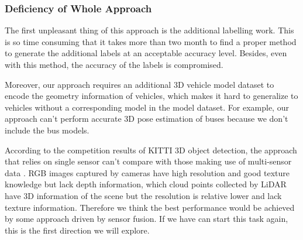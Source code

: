 \subsubsection{Deficiency of Whole Approach}
The first unpleasant thing of this approach is the additional labelling work. This is so time consuming that it takes more than two month to find a proper method to generate the additional labels at an acceptable accuracy level. Besides, even with this method, the accuracy of the labels is compromised.

Moreover, our approach requires an additional 3D vehicle model dataset to encode the geometry information of vehicles, which makes it hard to generalize to vehicles without a corresponding model in the model dataset. For example, our approach can't perform accurate 3D pose estimation of buses because we don't include the bus models.

According to the competition results of KITTI 3D object detection, the approach that relies on single sensor can't compare with those making use of multi-sensor data \cite{3dobject}. RGB images captured by cameras have high resolution and good texture knowledge but lack depth information, which cloud points collected by LiDAR have 3D information of the scene but the resolution is relative lower and lack texture information. Therefore we think the best performance would be achieved by some approach driven by sensor fusion. If we have can start this task again, this is the first direction we will explore.





